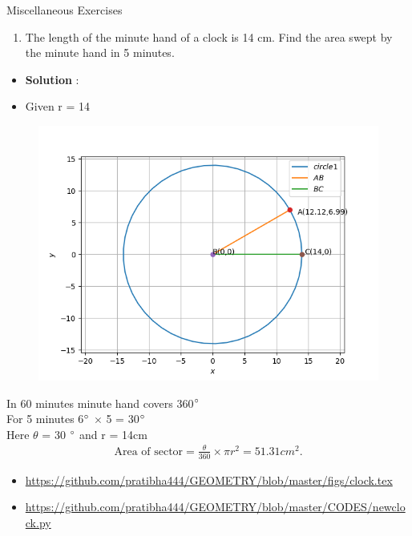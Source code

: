 \begin{frame}{Miscellaneous Exercises}
\begin{enumerate}
\conti
\item The length of the
minute hand of a clock is 14 cm. Find the area
swept by the minute hand in 5 minutes.\\
\seti
\end{enumerate}
\begin{itemize}
\item \textbf{Solution} :
\item Given r = 14 
\begin{figure}[!ht]
\resizebox{0.5\linewidth}{!}
{

}

\end{figure}


\end{itemize}
\end{frame}

\begin{frame}
\begin{figure}
\includegraphics[scale=.6]{./CODES/quad/MISC.png}
\end{figure}
\end{frame}

\begin{frame}

 In 60 minutes minute hand covers  360$\degree$\\
For 5 minutes 6$\degree$ $\times$ 5 = 30$\degree$\\ 
Here $\theta$ = 30 $\degree$ and r = 14cm\\

\begin{align*}
	\text{Area of sector} = \frac{\theta}{360} \times \pi r^2
	=51.31cm^2.
\end{align*}   
\begin{itemize}
\item \url {https://github.com/pratibha444/GEOMETRY/blob/master/figs/clock.tex} 
\item \url{https://github.com/pratibha444/GEOMETRY/blob/master/CODES/newclock.py}
\end{itemize}             
\end{frame}